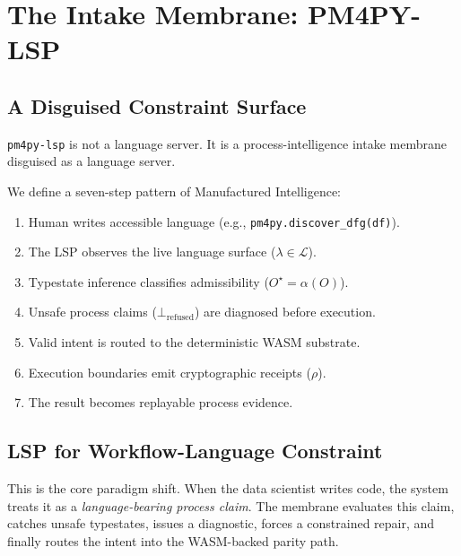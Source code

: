 
\chapter{The Intake Membrane: PM4PY-LSP}
\section{A Disguised Constraint Surface}
\texttt{pm4py-lsp} is not a language server. It is a process-intelligence intake membrane disguised as a language server.

We define a seven-step pattern of Manufactured Intelligence:
\begin{enumerate}
    \item Human writes accessible language (e.g., \texttt{pm4py.discover\_dfg(df)}).
    \item The LSP observes the live language surface ($\lambda \in \mathcal{L}$).
    \item Typestate inference classifies admissibility ($O^{\star} = \alpha(O)$).
    \item Unsafe process claims ($\bot_{\mathrm{refused}}$) are diagnosed before execution.
    \item Valid intent is routed to the deterministic WASM substrate.
    \item Execution boundaries emit cryptographic receipts ($\rho$).
    \item The result becomes replayable process evidence.
\end{enumerate}

\section{LSP for Workflow-Language Constraint}
This is the core paradigm shift. When the data scientist writes code, the system treats it as a \textit{language-bearing process claim}. The membrane evaluates this claim, catches unsafe typestates, issues a diagnostic, forces a constrained repair, and finally routes the intent into the WASM-backed parity path.
